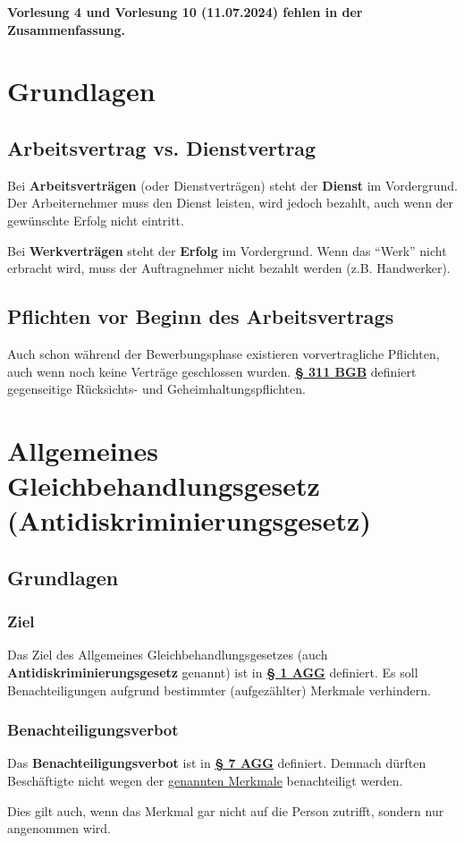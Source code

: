\documentclass[12pt,A4]{extarticle}
\newcommand{\highlight}[1]{\textcolor{highlightColor}{\textbf{#1}}}
\newcommand{\bgb}[2][]{\textbf{\textcolor{gesetzLink}{\href{https://www.gesetze-im-internet.de/bgb/__#2.html}{§ #2 \ifthenelse{\equal{#1}{}}{}{#1 }BGB}}}}
\newcommand{\agG}[2][]{\textbf{\textcolor{gesetzLink}{\href{https://www.gesetze-im-internet.de/agg/__#2.html}{§ #2 \ifthenelse{\equal{#1}{}}{}{#1 }AGG}}}}
\begin{document}
\disclaimer

\vspace{1cm}
\textbf{Vorlesung 4 und Vorlesung 10 (11.07.2024) fehlen in der Zusammenfassung.}
\vspace{-1cm}

\tableofcontents
\clearpage

\section{Grundlagen}
\subsection{Arbeitsvertrag vs. Dienstvertrag}
Bei \textbf{Arbeitsverträgen} (oder Dienstverträgen) steht der \textbf{Dienst} im Vordergrund. Der Arbeiternehmer muss den Dienst leisten, wird jedoch bezahlt, auch wenn der gewünschte Erfolg nicht eintritt.\par
Bei \textbf{Werkverträgen} steht der \textbf{Erfolg} im Vordergrund. Wenn das ``Werk'' nicht erbracht wird, muss der Auftragnehmer nicht bezahlt werden (z.B. Handwerker).

\subsection{Pflichten vor Beginn des Arbeitsvertrags}
Auch schon während der Bewerbungsphase existieren vorvertragliche Pflichten, auch wenn noch keine Verträge geschlossen wurden. \bgb[Abs. 2]{311} definiert gegenseitige Rücksichts- und Geheimhaltungspflichten.

\section{Allgemeines Gleichbehandlungsgesetz (Antidiskriminierungsgesetz)}
\subsection{Grundlagen}
\subsubsection{Ziel}\label{sec:aggZiel}
Das Ziel des Allgemeines Gleichbehandlungsgesetzes (auch \highlight{Antidiskriminierungsgesetz} genannt) ist in \agG{1} definiert. Es soll Benachteiligungen aufgrund bestimmter (aufgezählter) Merkmale verhindern.

\subsubsection{Benachteiligungsverbot}
Das \textbf{Benachteiligungsverbot} ist in \agG{7} definiert. Demnach dürften Beschäftigte nicht wegen der \hyperref[sec:aggZiel]{genannten Merkmale} benachteiligt werden.\par
Dies gilt auch, wenn das Merkmal gar nicht auf die Person zutrifft, sondern nur angenommen wird.
\end{document}
